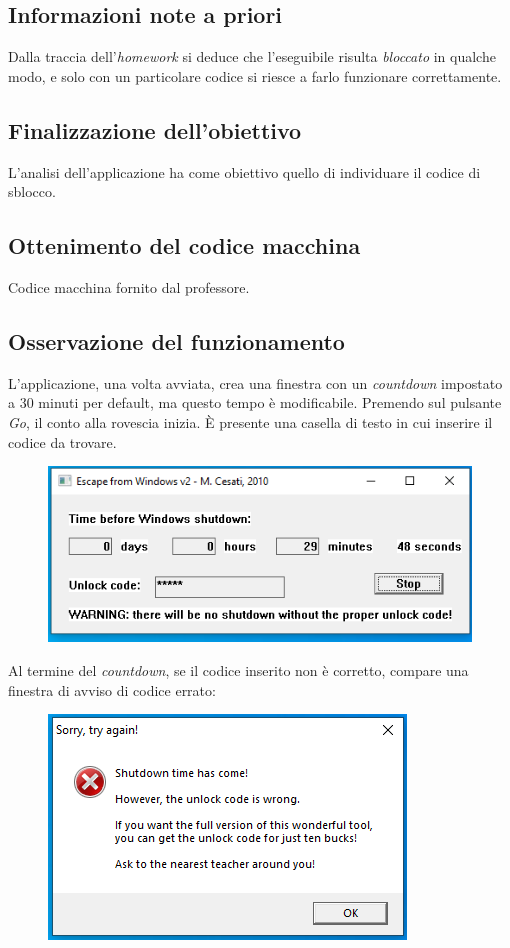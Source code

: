\documentclass[a4paper, 12pt]{article}
\begin{document}
\subsection{Informazioni note a priori}
Dalla traccia dell'\emph{homework} si deduce che l'eseguibile risulta \emph{bloccato} in qualche modo, e solo con un particolare codice si riesce a farlo funzionare correttamente.

\subsection{Finalizzazione dell'obiettivo}
L'analisi dell'applicazione ha come obiettivo quello di individuare il codice di sblocco.

\subsection{Ottenimento del codice macchina}
Codice macchina fornito dal professore.


\subsection{Osservazione del funzionamento}
L'applicazione, una volta avviata, crea una finestra con un \emph{countdown} impostato a 30 minuti per default, ma questo tempo è modificabile. Premendo sul pulsante \emph{Go}, il conto alla rovescia inizia. È presente una casella di testo in cui inserire il codice da trovare. 
\begin{figure}[H]
\centering\includegraphics[scale=0.4]{lauch_of_program}
\end{figure}
Al termine del \emph{countdown}, se il codice inserito non è corretto, compare una finestra di avviso di codice errato:
\begin{figure}[H]
\centering\includegraphics[scale=0.4]{error_code_ad}
\end{figure}
\end{document}

